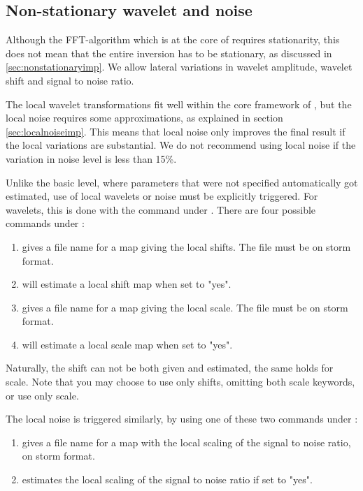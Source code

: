 \subsection{Non-stationary wavelet and noise}
Although the FFT-algorithm which is at the core of \crava requires
stationarity, this does not mean that the entire inversion has to be
stationary, as discussed in \autoref{sec:nonstationaryimp}. We allow
lateral variations in wavelet amplitude, wavelet shift and signal to
noise ratio.

The local wavelet transformations fit well within the core framework
of \crava, but the local noise requires some approximations, as
explained in section \autoref{sec:localnoiseimp}. This means that
local noise only improves the final result if the local variations are
substantial. We do not recommend using local noise if the variation in
noise level is less than 15\%.

Unlike the basic level, where parameters that were not specified
automatically got estimated, use of local wavelets or noise must be
explicitly triggered. For wavelets, this is done with the
 command under
. There are four possible commands under
: 
\begin{enumerate}
\item {} gives a file name for a map giving the local shifts. The file must be on storm format.
\item {} will estimate a local shift map when set to "yes".
\item {} gives a file name for a map giving the local scale. The file must be on storm format.
\item {} will estimate a local scale map when set to "yes".
\end{enumerate}
Naturally, the shift can not be both given and estimated, the same
holds for scale. Note that you may choose to use only shifts, omitting
both scale keywords, or use only scale. 

The local noise is triggered similarly, by using one of these two
commands under : 
\begin{enumerate}
\item {} gives a file name for a map with the local scaling of
  the signal to noise ratio, on storm format. 
\item {} estimates the local scaling of the
  signal to noise ratio if set to "yes". 
\end{enumerate}

